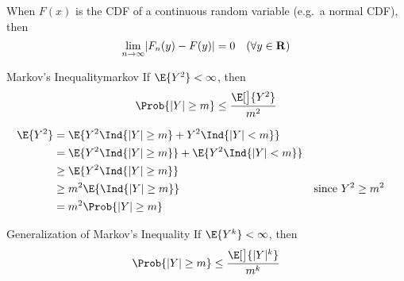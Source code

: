 \begin{Remark}{}{}
    When $ F(x) $ is the CDF of a continuous random variable
    (e.g.\ a normal CDF), then
    \[ \lim\limits_{{n} \to {\infty}} \lvert F_n(y)-F(y)\rvert=0\quad(\forall y\in\mathbf{R}) \]
\end{Remark}
\begin{Theorem}{Markov's Inequality}{markov}
    If $ \E{Y^2}<\infty $, then
    \[ \Prob{\abs{Y}\ge m}\le \frac{\E[\big]{Y^2}}{m^2}  \]
\end{Theorem}
\begin{Proof}{}{}
    \begin{align*}
        \E{Y^2}
         & =\E{Y^2 \Ind{\abs{Y}\ge m}+Y^2 \Ind{\abs{Y}<m}}                                    \\
         & =\E{Y^2 \Ind{\abs{Y}\ge m}} + \E{Y^2 \Ind{\abs{Y}<m}}                              \\
         & \ge \E{Y^2 \Ind{\abs{Y}\ge m}}                                                     \\
         & \ge m^2\E{\Ind{\abs{Y}\ge m}}                         &  & \text{since }Y^2\ge m^2 \\
         & =m^2\Prob{\abs{Y}\ge m}
    \end{align*}
\end{Proof}
\begin{Remark}{Generalization of Markov's Inequality}{}
    If $ \E{Y^k}<\infty $, then
    \[ \Prob{\abs{Y}\ge m}\le  \frac{\E[\big]{\abs{Y}^k}}{m^k}  \]
\end{Remark}
